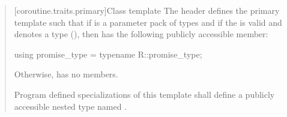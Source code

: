 \begin{quote}


%
%

[coroutine.traits.primary]{Class template }
\pnum The header  defines
the primary template  such that 
if  is a parameter pack of types and 
if the   is valid and
denotes a type (),
then
 has the following publicly accessible member:

\begin{codeblock}
  using promise_type = typename R::promise_type;
\end{codeblock}

Otherwise,  has no members.

\pnum Program defined specializations of this template shall define a publicly accessible nested type named .
	


\end{quote}
